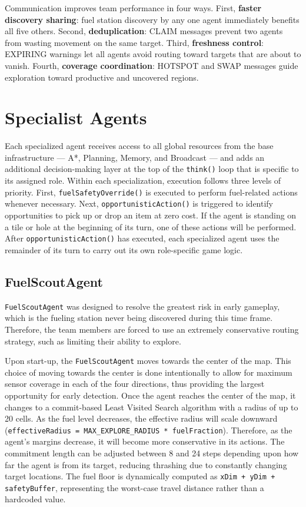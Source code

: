 \documentclass[letterpaper]{article}
\begin{document}
Communication improves team performance in four ways. First, \textbf{faster
discovery sharing}: fuel station discovery by any one agent immediately benefits
all five others. Second, \textbf{deduplication}: CLAIM messages prevent two
agents from wasting movement on the same target. Third, \textbf{freshness
control}: EXPIRING warnings let all agents avoid routing toward targets that are
about to vanish. Fourth, \textbf{coverage coordination}: HOTSPOT and SWAP
messages guide exploration toward productive and uncovered regions.

\section{Specialist Agents}
Each specialized agent receives access to all global resources from the base 
infrastructure --- A*, Planning, Memory, and Broadcast --- and adds an additional 
decision-making layer at the top of the \texttt{think()} loop that is specific to 
its assigned role. Within each specialization, execution follows three levels of 
priority. First, \texttt{fuelSafetyOverride()} is executed to perform fuel-related 
actions whenever necessary. Next, \texttt{opportunisticAction()} is triggered to 
identify opportunities to pick up or drop an item at zero cost. If the agent is 
standing on a tile or hole at the beginning of its turn, one of these actions will 
be performed. After \texttt{opportunisticAction()} has executed, each specialized 
agent uses the remainder of its turn to carry out its own role-specific game logic.

\subsection{FuelScoutAgent}
\texttt{FuelScoutAgent} was designed to resolve the greatest risk in early gameplay, 
which is the fueling station never being discovered during this time frame. Therefore, the team members are forced to use an extremely conservative routing strategy, such as limiting their ability to explore.

Upon start-up, the \texttt{FuelScoutAgent} moves towards the center of the map. This 
choice of moving towards the center is done intentionally to allow for maximum sensor coverage in each of the four directions, thus providing the largest opportunity for early detection. Once the agent reaches the center of the map, it changes to a commit-based Least Visited Search algorithm with a radius of up to 20 cells. As the fuel level decreases, the effective radius will scale downward 
(\texttt{effectiveRadius = MAX\_EXPLORE\_RADIUS * fuelFraction}). Therefore, as the 
agent's margins decrease, it will become more conservative in its actions. The 
commitment length can be adjusted between 8 and 24 steps depending upon how far the 
agent is from its target, reducing thrashing due to constantly changing target 
locations. The fuel floor is dynamically computed as \texttt{xDim + yDim + 
safetyBuffer}, representing the worst-case travel distance rather than a hardcoded 
value.
\end{document}
